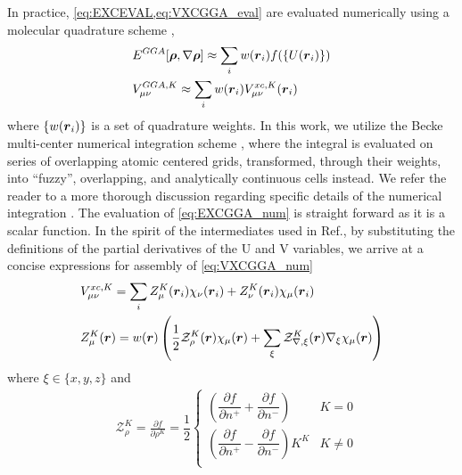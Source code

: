 In practice, \cref{eq:EXCEVAL,eq:VXCGGA_eval} are evaluated numerically using a molecular quadrature scheme
\cite{Becke88_2547,Jackson90_7453,Laming93_997,Johnson95_169,Frisch96_213,Reveles04_681,Sierka11_3097},
\begin{align}
  &E^{GGA}[\boldsymbol{\rho},\nabla\boldsymbol{\rho}] \approx \sum_i w(\boldsymbol{r}_i) f(\{U(\boldsymbol{r}_i)\}) \label{eq:EXCGGA_num}\\
  &V^{GGA,K}_{\mu\nu} \approx \sum_i w(\boldsymbol{r}_i) V^{xc,K}_{\mu\nu}(\boldsymbol{r}_i) \label{eq:VXCGGA_num}
\end{align}
where $\{w(\boldsymbol{r}_i)\}$ is a set of quadrature weights. 
In this work, we utilize the Becke multi-center numerical integration scheme
\cite{Becke88_2547}, where the integral is evaluated on series of overlapping
atomic centered grids, transformed, through their weights, into ``fuzzy'',
overlapping, and analytically continuous cells instead.  We refer the
reader to a more thorough discussion regarding specific
details of the numerical integration \cite{Becke88_2547,Frisch96_213}.
The evaluation of \cref{eq:EXCGGA_num} is straight forward as it is a scalar function. In the spirit of the intermediates used
in Ref.\cite{Sierka11_3097}, by substituting the definitions of the partial derivatives of the U and V variables, we arrive
at a concise expressions for assembly of \cref{eq:VXCGGA_num} 
\begin{align}
&V^{xc,K}_{\mu\nu} = \sum_i Z^K_\mu(\boldsymbol{r}_i) \chi_\nu(\boldsymbol{r}_i) + Z^K_\nu(\boldsymbol{r}_i) \chi_\mu(\boldsymbol{r}_i) \label{eq:VXC_point_update}\\
  &Z^K_\mu(\boldsymbol{r}) = w(\boldsymbol{r})
    \left(
      \frac{1}{2} \mathcal{Z}^K_{\rho}(\boldsymbol{r}) \chi_\mu(\boldsymbol{r}) + \sum_\xi \mathcal{Z}^K_{\nabla,\xi}(\boldsymbol{r}) \nabla_\xi \chi_\mu(\boldsymbol{r})
    \right) \label{eq:ZKmu}
\end{align}
where $\xi \in \{x,y,z\}$ and
\begin{subequations}
\begin{align}
&\mathcal{Z}^K_{\rho}=     \frac{\partial f}{\partial \rho^K} =
                                     \dfrac{1}{2}
                                     \begin{cases}
  \left( \dfrac{\partial f}{\partial n^+} + \dfrac{\partial f}{\partial n^-} \right) & K = 0 \\[12pt]
  \left( \dfrac{\partial f}{\partial n^+} - \dfrac{\partial f}{\partial n^-} \right) K^{K} & K \neq 0 \\
                                     \end{cases}
\end{align}
\label{eq:ZrhoVar}
\end{subequations}

